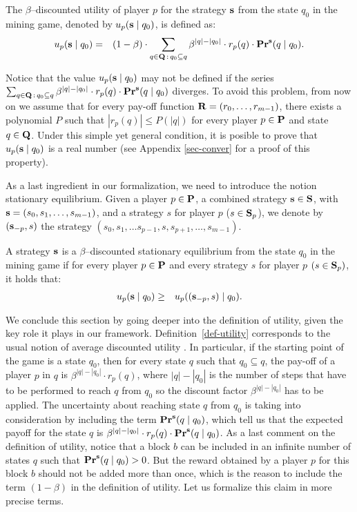 \begin{mydef}
\label{def-utility}
The $\beta$--discounted utility of player $p$ for the strategy $\mathbf{s}$ from the state $q_0$ in 
the mining game, denoted by $u_p(\mathbf{s} \mid q_0)$, is defined as:
\begin{eqnarray*}
u_p(\mathbf{s} \mid q_0) & = & (1 - \beta) \cdot  \sum_{q \in \mathbf{Q} \,:\, q_0 \subseteq q} \beta^{|q|-|q_0|} \cdot  r_p(q) \cdot \mathbf{Pr}^{\mathbf{s}}(q \mid q_0).
\end{eqnarray*}
\end{mydef}
Notice that the value $u_p(\mathbf{s} \mid q_0)$ may not be defined if the series $\sum_{q \in \mathbf{Q} \,:\, q_0 \subseteq q} \beta^{|q|-|q_0|} \cdot  r_p(q) \cdot \mathbf{Pr}^{\mathbf{s}}(q \mid q_0)$ diverges. To avoid this problem, from now on we assume that for every pay-off function $\mathbf{R} = (r_0, \ldots, r_{m-1})$, there exists a polynomial $P$ such that $|r_p(q)| \leq P(|q|)$ for every player $p \in \mathbf{P}$ and state $q \in \mathbf{Q}$. Under this simple yet general condition, it is posible to prove that $u_p(\mathbf{s} \mid q_0)$ is a real number (see Appendix \ref{sec-conver} for a proof of this property). 

As a last ingredient in our formalization, we need to introduce the notion stationary equilibrium.
Given a player $p \in \mathbf{P}$, a combined strategy $\mathbf{s} \in \mathbf{S}$, with $\mathbf{s} = (s_0,s_1, \ldots, s_{m-1})$, and a strategy $s$ for player $p$ ($s \in \mathbf{S}_p$), we denote by $(\mathbf{s}_{-p}, s)$ the strategy $(s_0, s_1, \ldots s_{p-1},s,s_{p+1}, \ldots, s_{m-1})$.
\begin{mydef}
A strategy $\mathbf{s}$ is a $\beta$--discounted stationary equilibrium from the state $q_0$ in  the %
mining game if for every player $p \in \mathbf{P}$ and every strategy $s$ for player $p$ $(s \in\mathbf{S}_p)$, it holds that:
\begin{eqnarray*}u_p(\mathbf{s} \mid q_0)  & \geq  & u_p ((\mathbf{s}_{-p},s) \mid q_0).
\end{eqnarray*}
\end{mydef}
We conclude this section by going deeper into the definition of utility, given the key role it plays in our framework. 
Definition~\ref{def-utility} corresponds to the usual notion of average discounted utility . In particular, if the starting point of the game is a state $q_0$, then for every state $q$ such that $q_0 \subseteq q$, the pay-off of a player $p$ in $q$ is $\beta^{|q|-|q_0|} \cdot r_p(q)$, where $|q|-|q_0|$ is the number of steps that have to be performed to reach $q$ from $q_0$ so the discount factor $\beta^{|q|-|q_0|}$ has to be applied. The uncertainty  about reaching state $q$ from $q_0$ is taking into consideration by including the term $\mathbf{Pr}^{\mathbf{s}}(q \mid q_0)$, which tell us that the expected payoff for the state $q$ is $\beta^{|q|-|q_0|} \cdot  r_p(q) \cdot \mathbf{Pr}^{\mathbf{s}}(q \mid q_0)$.  
%
As a last comment on the definition of utility, notice that a block $b$ can be included in an infinite number of states $q$ such that $\mathbf{Pr}^{\mathbf{s}}(q \mid q_0) > 0$. But the reward obtained by a player $p$ for this block $b$ should not be added more than once, which is the reason to include the term $(1 - \beta)$ in the definition of utility. Let us formalize this claim in more precise terms. 

